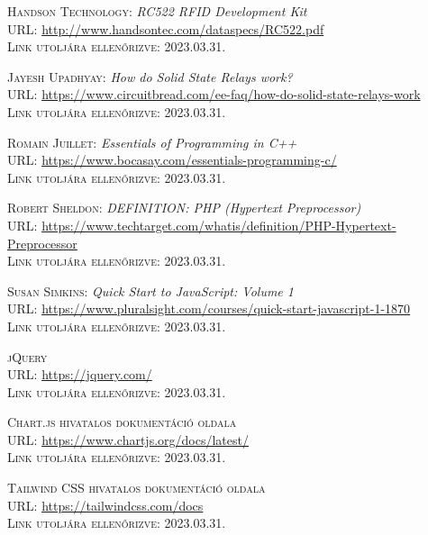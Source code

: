 \documentclass[
]{thesis-ekf}
\theoremstyle{definition}
\theoremstyle{remark}
\begin{document}
\begin{thebibliography}{20}
		\textsc{Handson Technology:} \emph{RC522 RFID Development Kit}\\
		\textsc{URL:} \url{http://www.handsontec.com/dataspecs/RC522.pdf}\\
		\textsc{Link utoljára ellenőrizve:} 2023.03.31.
		
		\textsc{Jayesh Upadhyay:} \emph{How do Solid State Relays work?}\\
		\textsc{URL:} \url{https://www.circuitbread.com/ee-faq/how-do-solid-state-relays-work}\\
		\textsc{Link utoljára ellenőrizve:} 2023.03.31.
		
		\textsc{Romain Juillet:} \emph{Essentials of Programming in C++}\\
		\textsc{URL:} \url{https://www.bocasay.com/essentials-programming-c/}\\
		\textsc{Link utoljára ellenőrizve:} 2023.03.31.
		
		\textsc{Robert Sheldon:} \emph{DEFINITION: PHP (Hypertext Preprocessor)}\\
		\textsc{URL:} \url{https://www.techtarget.com/whatis/definition/PHP-Hypertext-Preprocessor}\\
		\textsc{Link utoljára ellenőrizve:} 2023.03.31.
		
		\textsc{Susan Simkins:} \emph{Quick Start to JavaScript: Volume 1}\\
		\textsc{URL:} \url{https://www.pluralsight.com/courses/quick-start-javascript-1-1870}\\
		\textsc{Link utoljára ellenőrizve:} 2023.03.31.
		
		\textsc{jQuery}\\
		\textsc{URL:} \url{https://jquery.com/}\\
		\textsc{Link utoljára ellenőrizve:} 2023.03.31.
		
		\textsc{Chart.js hivatalos dokumentáció oldala}\\
		\textsc{URL:} \url{https://www.chartjs.org/docs/latest/}\\
		\textsc{Link utoljára ellenőrizve:} 2023.03.31.
		
		\textsc{Tailwind CSS hivatalos dokumentáció oldala}\\
		\textsc{URL:} \url{https://tailwindcss.com/docs}\\
		\textsc{Link utoljára ellenőrizve:} 2023.03.31.
		

\end{thebibliography}
\end{document}
